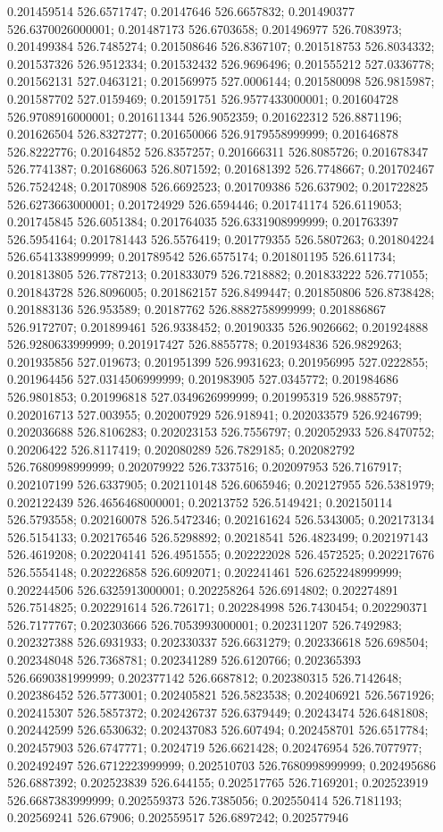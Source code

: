 0.201459514 526.6571747; 0.20147646 526.6657832; 0.201490377 526.6370026000001; 0.201487173 526.6703658; 0.201496977 526.7083973; 0.201499384 526.7485274; 0.201508646 526.8367107; 0.201518753 526.8034332; 0.201537326 526.9512334; 0.201532432 526.9696496; 0.201555212 527.0336778; 0.201562131 527.0463121; 0.201569975 527.0006144; 0.201580098 526.9815987; 0.201587702 527.0159469; 0.201591751 526.9577433000001; 0.201604728 526.9708916000001; 0.201611344 526.9052359; 0.201622312 526.8871196; 0.201626504 526.8327277; 0.201650066 526.9179558999999; 0.201646878 526.8222776; 0.20164852 526.8357257; 0.201666311 526.8085726; 0.201678347 526.7741387; 0.201686063 526.8071592; 0.201681392 526.7748667; 0.201702467 526.7524248; 0.201708908 526.6692523; 0.201709386 526.637902; 0.201722825 526.6273663000001; 0.201724929 526.6594446; 0.201741174 526.6119053; 0.201745845 526.6051384; 0.201764035 526.6331908999999; 0.201763397 526.5954164; 0.201781443 526.5576419; 0.201779355 526.5807263; 0.201804224 526.6541338999999; 0.201789542 526.6575174; 0.201801195 526.611734; 0.201813805 526.7787213; 0.201833079 526.7218882; 0.201833222 526.771055; 0.201843728 526.8096005; 0.201862157 526.8499447; 0.201850806 526.8738428; 0.201883136 526.953589; 0.20187762 526.8882758999999; 0.201886867 526.9172707; 0.201899461 526.9338452; 0.20190335 526.9026662; 0.201924888 526.9280633999999; 0.201917427 526.8855778; 0.201934836 526.9829263; 0.201935856 527.019673; 0.201951399 526.9931623; 0.201956995 527.0222855; 0.201964456 527.0314506999999; 0.201983905 527.0345772; 0.201984686 526.9801853; 0.201996818 527.0349626999999; 0.201995319 526.9885797; 0.202016713 527.003955; 0.202007929 526.918941; 0.202033579 526.9246799; 0.202036688 526.8106283; 0.202023153 526.7556797; 0.202052933 526.8470752; 0.20206422 526.8117419; 0.202080289 526.7829185; 0.202082792 526.7680998999999; 0.202079922 526.7337516; 0.202097953 526.7167917; 0.202107199 526.6337905; 0.202110148 526.6065946; 0.202127955 526.5381979; 0.202122439 526.4656468000001; 0.20213752 526.5149421; 0.202150114 526.5793558; 0.202160078 526.5472346; 0.202161624 526.5343005; 0.202173134 526.5154133; 0.202176546 526.5298892; 0.20218541 526.4823499; 0.202197143 526.4619208; 0.202204141 526.4951555; 0.202222028 526.4572525; 0.202217676 526.5554148; 0.202226858 526.6092071; 0.202241461 526.6252248999999; 0.202244506 526.6325913000001; 0.202258264 526.6914802; 0.202274891 526.7514825; 0.202291614 526.726171; 0.202284998 526.7430454; 0.202290371 526.7177767; 0.202303666 526.7053993000001; 0.202311207 526.7492983; 0.202327388 526.6931933; 0.202330337 526.6631279; 0.202336618 526.698504; 0.202348048 526.7368781; 0.202341289 526.6120766; 0.202365393 526.6690381999999; 0.202377142 526.6687812; 0.202380315 526.7142648; 0.202386452 526.5773001; 0.202405821 526.5823538; 0.202406921 526.5671926; 0.202415307 526.5857372; 0.202426737 526.6379449; 0.20243474 526.6481808; 0.202442599 526.6530632; 0.202437083 526.607494; 0.202458701 526.6517784; 0.202457903 526.6747771; 0.2024719 526.6621428; 0.202476954 526.7077977; 0.202492497 526.6712223999999; 0.202510703 526.7680998999999; 0.202495686 526.6887392; 0.202523839 526.644155; 0.202517765 526.7169201; 0.202523919 526.6687383999999; 0.202559373 526.7385056; 0.202550414 526.7181193; 0.202569241 526.67906; 0.202559517 526.6897242; 0.202577946 